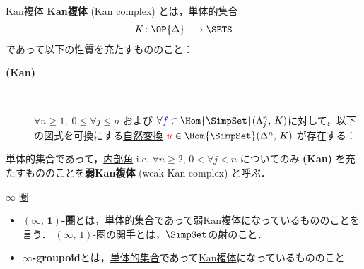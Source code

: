 \documentclass[TQFT_main]{subfiles}
\begin{document}
\begin{mydef}[label=def:KanCplx,breakable]{Kan複体}
    \textbf{Kan複体} (Kan complex) とは，\hyperref[def:SimpSet]{単体的集合}
    \begin{align}
        K \colon \OP{\Delta} \lto \SETS
    \end{align}
    であって以下の性質を充たすもののこと：

    \begin{description}
        \item[\textbf{(Kan)}]　
        
        $\forall n \ge 1,\; 0 \le \forall j \le n$ および $\forall \textcolor{blue}{f} \in \Hom{\SimpSet}(\Lambda^n_j,\, K)$に対して，以下の図式を可換にする\hyperref[def:nat]{自然変換} $\textcolor{red}{u} \in \Hom{\SimpSet}(\Delta^n,\, K)$ が存在する：
        \begin{center}
        \end{center}
        
    \end{description}
    
    \tcblower

    単体的集合であって，\hyperref[def:horn]{内部角} i.e. $\forall n \ge 2,\, 0 < \forall j < n$ についてのみ \textsf{\textbf{(Kan)}} を充たすもののことを\textbf{弱Kan複体} (weak Kan complex) と呼ぶ．
\end{mydef}

\begin{mydef}[label=def:infinity-1]{$\infty$-圏}
    \begin{itemize}
        \item $\bm{(\infty,\, 1)}$\textbf{-圏}とは，\hyperref[def:SimpSet]{単体的集合}であって\hyperref[def:KanCplx]{弱Kan複体}になっているもののことを言う．
        $(\infty,\, 1)$-圏の関手とは，\hyperref[def:SimpSet]{$\SimpSet$}の射のこと．
        \item $\bm{\infty}$\textbf{-groupoid}とは，\hyperref[def:SimpSet]{単体的集合}であって\hyperref[def:KanCplx]{Kan複体}になっているもののこと
    \end{itemize}
    
\end{mydef}
\end{document}
